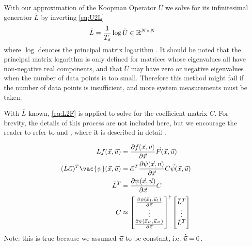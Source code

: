With our approximation of the Koopman Operator $\bar{U}$ we solve for its infinitesimal generator $\bar{L}$ by inverting  \eqref{eq:U2L}
\begin{align}
    \bar{L} &= \frac{1}{T_s} \log{ \bar{U} } \in \mathbb{R}^{N \times N}
\end{align}
where $\log$ denotes the principal matrix logarithm .
It should be noted that the principal matrix logarithm is only defined for matrices whose eigenvalues all have non-negative real components, and that $\bar{U}$ may have zero or negative eigenvalues when the number of data points is too small.
Therefore this method might fail if the number of data points is insufficient, and more system measurements must be taken.

With $\bar{L}$ known, \eqref{eq:L2F} is applied to solve for the coefficient matrix $C$.
For brevity, the details of this process are not included here, but we encourage the reader to refer to \cite{mauroy2016linear} and \cite{mauroy2017koopman}, where it is described in detail .

\begin{align}
    \bar{L} f(\xv, \uv) &= \frac{\partial f(\xv, \uv)}{\partial \xv} \Fv(\xv, \uv) \\
    (\bar{L} \vec{\alpha})^T \vac{\psi}(\xv,\uv) &= \vec{\alpha}^T \frac{\partial \psi(\xv, \uv)}{\partial \xv} C \vec{\psi}(\xv,\uv) \\
    \bar{L}^T &= \frac{\partial \psi(\xv, \uv)}{\partial \xv} C \\
    C &\approx \mtx{ \frac{\partial \psi(\xv_1, \uv_1)}{\partial \xv} \\ \vdots \\ \frac{\partial \psi(\xv_K, \uv_K)}{\partial \xv} }^\dagger
        \mtx{ \bar{L}^T \\ \vdots \\ \bar{L}^T }
\end{align}
Note: this is true because we assumed $\vec{u}$ to be constant, i.e. $\dot{\vec{u}} = 0$.

